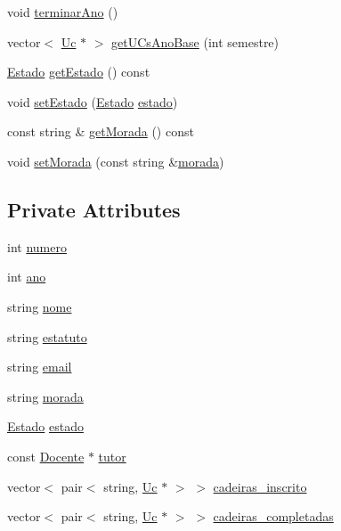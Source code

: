 \begin{DoxyCompactItemize}
\item 
void \hyperlink{class_aluno_a541c17d0c9a626c132153936dc6065f5}{terminar\+Ano} ()
\item 
vector$<$ \hyperlink{class_uc}{Uc} $\ast$ $>$ \hyperlink{class_aluno_a3bcc5d9133d8f034ef862c596b07c2ec}{get\+U\+Cs\+Ano\+Base} (int semestre)
\item 
\hyperlink{aluno_8h_a9d4630b1e0c310d9b8c562abd8114c49}{Estado} \hyperlink{class_aluno_a3e853d005e1ed55e130b660b925e604d}{get\+Estado} () const
\item 
void \hyperlink{class_aluno_a7786eb123c2bc7bcdf3ea14432ffdadd}{set\+Estado} (\hyperlink{aluno_8h_a9d4630b1e0c310d9b8c562abd8114c49}{Estado} \hyperlink{class_aluno_a9c848f698de935f301a0e5becd087cc1}{estado})
\item 
const string \& \hyperlink{class_aluno_a7c0acf4e931f989aa8bb5d707b6cf7c5}{get\+Morada} () const
\item 
void \hyperlink{class_aluno_aa96c2e587fd84faa59864a50cd8393ec}{set\+Morada} (const string \&\hyperlink{class_aluno_a5824ede0b7b791dcbe13aeeba1c26372}{morada})
\end{DoxyCompactItemize}
\subsection*{Private Attributes}
\begin{DoxyCompactItemize}
\item 
int \hyperlink{class_aluno_a49ba5929b875d3f502c48245775b834c}{numero}
\item 
int \hyperlink{class_aluno_abcf2d0bb0b690d81e01e9b38f68897c6}{ano}
\item 
string \hyperlink{class_aluno_a22e26cb85066e4dfdc144c502819a7b4}{nome}
\item 
string \hyperlink{class_aluno_ae0609c8c3939eee522aee8e7c68a2eac}{estatuto}
\item 
string \hyperlink{class_aluno_a3f211b7d1b0aac05976bf25912b66c6b}{email}
\item 
string \hyperlink{class_aluno_a5824ede0b7b791dcbe13aeeba1c26372}{morada}
\item 
\hyperlink{aluno_8h_a9d4630b1e0c310d9b8c562abd8114c49}{Estado} \hyperlink{class_aluno_a9c848f698de935f301a0e5becd087cc1}{estado}
\item 
const \hyperlink{class_docente}{Docente} $\ast$ \hyperlink{class_aluno_a0569ac677617ba6b9fc420830bc21bf6}{tutor}
\item 
vector$<$ pair$<$ string, \hyperlink{class_uc}{Uc} $\ast$ $>$ $>$ \hyperlink{class_aluno_a1999cc002e1c271c4722717ab457b4e4}{cadeiras\+\_\+inscrito}
\item 
vector$<$ pair$<$ string, \hyperlink{class_uc}{Uc} $\ast$ $>$ $>$ \hyperlink{class_aluno_aa9de55282ab2d53a6e903999db67eefc}{cadeiras\+\_\+completadas}
\end{DoxyCompactItemize}


